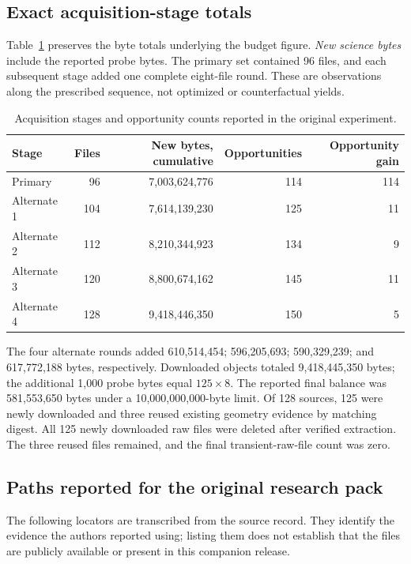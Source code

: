 \subsection{Exact acquisition-stage totals}
Table~\ref{tab:supp-activation} preserves the byte totals underlying the budget figure. \emph{New science bytes} include the reported probe bytes. The primary set contained 96 files, and each subsequent stage added one complete eight-file round. These are observations along the prescribed sequence, not optimized or counterfactual yields.

\begin{table}[htbp]
\caption{Acquisition stages and opportunity counts reported in the original experiment.}
\label{tab:supp-activation}
\centering
\small
\begin{tabularx}{\textwidth}{@{}Xrrrr@{}}
\toprule
Stage & Files & New bytes, cumulative & Opportunities & Opportunity gain \\
\midrule
Primary & 96 & 7,003,624,776 & 114 & 114 \\
Alternate 1 & 104 & 7,614,139,230 & 125 & 11 \\
Alternate 2 & 112 & 8,210,344,923 & 134 & 9 \\
Alternate 3 & 120 & 8,800,674,162 & 145 & 11 \\
Alternate 4 & 128 & 9,418,446,350 & 150 & 5 \\
\bottomrule
\end{tabularx}
\end{table}

The four alternate rounds added 610,514,454; 596,205,693; 590,329,239; and 617,772,188 bytes, respectively. Downloaded objects totaled 9,418,445,350 bytes; the additional 1,000 probe bytes equal $125\times8$. The reported final balance was 581,553,650 bytes under a 10,000,000,000-byte limit. Of 128 sources, 125 were newly downloaded and three reused existing geometry evidence by matching digest. All 125 newly downloaded raw files were deleted after verified extraction. The three reused files remained, and the final transient-raw-file count was zero.

\subsection{Paths reported for the original research pack}
The following locators are transcribed from the source record. They identify the evidence the authors reported using; listing them does not establish that the files are publicly available or present in this companion release.

